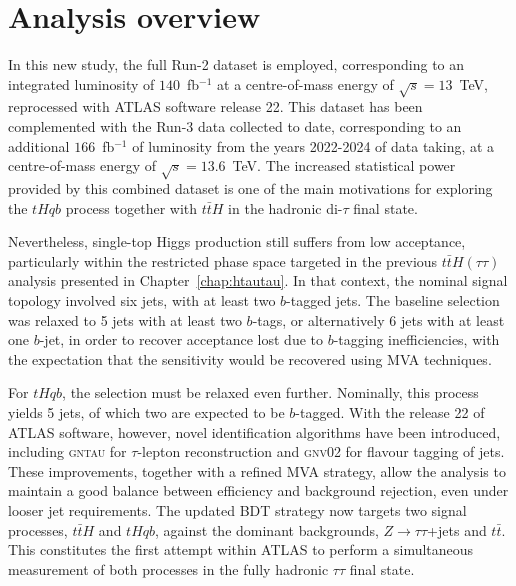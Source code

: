 \section{Analysis overview}

In this new study, the full Run-2 dataset is employed, corresponding to an integrated luminosity of $140$~fb$^{-1}$ at a centre-of-mass energy of $\sqrt{s}=13$~TeV, reprocessed with ATLAS software release 22. 
This dataset has been complemented with the Run-3 data collected to date, corresponding to an additional $166$~fb$^{-1}$ of luminosity from the years 2022-2024 of data taking, at a centre-of-mass energy of $\sqrt{s}=13.6$~TeV.
The increased statistical power provided by this combined dataset is one of the main motivations for exploring the $tHqb$ process together with $t\bar{t}H$ in the hadronic di-$\tau$ final state. 

Nevertheless, single-top Higgs production still suffers from low acceptance, particularly within the restricted phase space targeted in the previous $t\bar{t}H(\tau\tau)$ analysis presented in Chapter~\ref{chap:htautau}. 
In that context, the nominal signal topology involved six jets, with at least two $b$-tagged jets. 
The baseline selection was relaxed to 5 jets with at least two $b$-tags, or alternatively 6 jets with at least one $b$-jet, in order to recover acceptance lost due to $b$-tagging inefficiencies, with the expectation that the sensitivity would be recovered using MVA techniques. 

For $tHqb$, the selection must be relaxed even further. 
Nominally, this process yields 5 jets, of which two are expected to be $b$-tagged. 
With the release 22 of ATLAS software, however, novel identification algorithms have been introduced, including \textsc{gntau} for $\tau$-lepton reconstruction and \textsc{gnv02} for flavour tagging of jets. 
These improvements, together with a refined MVA strategy, allow the analysis to maintain a good balance between efficiency and background rejection, even under looser jet requirements. 
The updated BDT strategy now targets two signal processes, $t\bar{t}H$ and $tHqb$, against the dominant backgrounds, $Z\to\tau\tau$+jets and $t\bar{t}$. 
This constitutes the first attempt within ATLAS to perform a simultaneous measurement of both processes in the fully hadronic $\tau\tau$ final state. 


